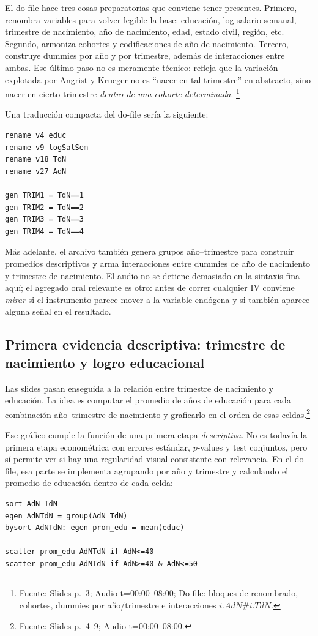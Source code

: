 \documentclass[11pt]{article}
\newcommand{\q}[1]{``#1''}
\newcommand{\source}[2]{\footnote{Fuente: Slides p.~#1; Audio t=#2.}}
\newcommand{\sourced}[3]{\footnote{Fuente: Slides p.~#1; Audio t=#2; Do-file: #3.}}
\begin{document}
El do-file hace tres cosas preparatorias que conviene tener presentes. Primero, renombra variables para volver legible la base: educación, log salario semanal, trimestre de nacimiento, año de nacimiento, edad, estado civil, región, etc. Segundo, armoniza cohortes y codificaciones de año de nacimiento. Tercero, construye dummies por año y por trimestre, además de interacciones entre ambas. Ese último paso no es meramente técnico: refleja que la variación explotada por Angrist y Krueger no es \q{nacer en tal trimestre} en abstracto, sino nacer en cierto trimestre \emph{dentro de una cohorte determinada}. \sourced{3}{00:00--08:00}{bloques de renombrado, cohortes, dummies por año/trimestre e interacciones \(i.AdN\#i.TdN\)}

Una traducción compacta del do-file sería la siguiente:
\begin{lstlisting}
rename v4 educ
rename v9 logSalSem
rename v18 TdN
rename v27 AdN

gen TRIM1 = TdN==1
gen TRIM2 = TdN==2
gen TRIM3 = TdN==3
gen TRIM4 = TdN==4
\end{lstlisting}

Más adelante, el archivo también genera grupos año--trimestre para construir promedios descriptivos y arma interacciones entre dummies de año de nacimiento y trimestre de nacimiento. El audio no se detiene demasiado en la sintaxis fina aquí; el agregado oral relevante es otro: antes de correr cualquier IV conviene \emph{mirar} si el instrumento parece mover a la variable endógena y si también aparece alguna señal en el resultado.

\subsection{Primera evidencia descriptiva: trimestre de nacimiento y logro educacional}

Las slides pasan enseguida a la relación entre trimestre de nacimiento y educación. La idea es computar el promedio de años de educación para cada combinación año--trimestre de nacimiento y graficarlo en el orden de esas celdas.\source{4--9}{00:00--08:00}

Ese gráfico cumple la función de una primera etapa \emph{descriptiva}. No es todavía la primera etapa econométrica con errores estándar, \(p\)-values y test conjuntos, pero sí permite ver si hay una regularidad visual consistente con relevancia. En el do-file, esa parte se implementa agrupando por año y trimestre y calculando el promedio de educación dentro de cada celda:
\begin{lstlisting}
sort AdN TdN
egen AdNTdN = group(AdN TdN)
bysort AdNTdN: egen prom_edu = mean(educ)

scatter prom_edu AdNTdN if AdN<=40
scatter prom_edu AdNTdN if AdN>=40 & AdN<=50
\end{lstlisting}
\end{document}
